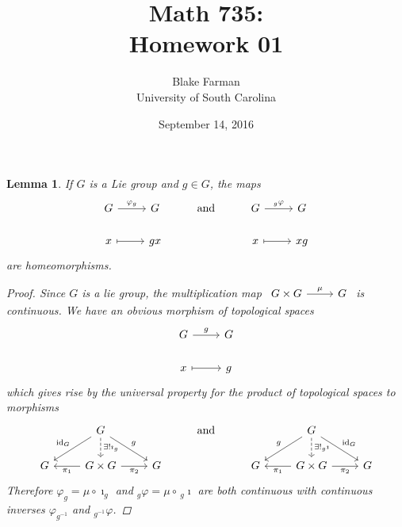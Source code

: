 \documentclass[10pt]{amsart}
\author{Blake Farman\\University of South Carolina}
\title{Math 735:\\Homework 01}
\date{September 14, 2016}
\begin{document}
\maketitle

\providecommand{\p}{\mathfrak{p}}
\providecommand{\m}{\mathfrak{m}}
\providecommand{\Deck}[1]{\operatorname{Deck}\left(#1\right)}
\newtheorem{thm}{Theorem}
\newtheorem{ex}{}
\newtheorem{lem}{Lemma}
\newtheorem{cor}{Corollary}
\newtheorem{prop}{Proposition}
\theoremstyle{definition}
\newtheorem{defn}{Definition}

\newcommand{\A}{\mathbb{A}}

\begin{lem}\label{lem1}
  If $G$ is a Lie group and $g \in G$, the maps
  $$\begin{tikzcd}
    G \arrow{r}{\varphi_g} & G & \text{and} & G \arrow{r}{_g\varphi} & G\\
    x \arrow[mapsto]{r} & gx & & x \arrow[mapsto]{r} & xg
  \end{tikzcd}$$
  are homeomorphisms.
  \begin{proof}
    Since $G$ is a lie group, the multiplication map 
    $\begin{tikzcd}
      G \times G \arrow{r}{\mu} & G 
    \end{tikzcd}$
      is continuous.
      We have an obvious morphism of topological spaces
      $$\begin{tikzcd}
        G \arrow{r}{g} & G\\
        x \arrow[mapsto]{r} & g
      \end{tikzcd}$$
      which gives rise by the universal property for the product of topological spaces to morphisms
      $$\begin{tikzcd}
        & G \arrow[swap]{ld}{\operatorname{id}_G} \arrow{rd}{g} \arrow[dashed]{d}{\exists !\imath_g} & &\text{and} & & G\arrow[swap]{ld}{g} \arrow{rd}{\operatorname{id}_G}\arrow[dashed]{d}{\exists ! _g\imath}\\
        G & \arrow{l}{\pi_1} G \times G \arrow[swap]{r}{\pi_2} & G & & G & \arrow{l}{\pi_1} G \times G \arrow[swap]{r}{\pi_2} & G
      \end{tikzcd}$$
      Therefore $\varphi_g = \mu \circ \imath_g$ and $_g\varphi = \mu \circ\,_g\imath$ are both continuous with continuous inverses $\varphi_{g^{-1}}$ and $_{g^{-1}}\varphi$.
  \end{proof}
\end{lem}
\end{document}
